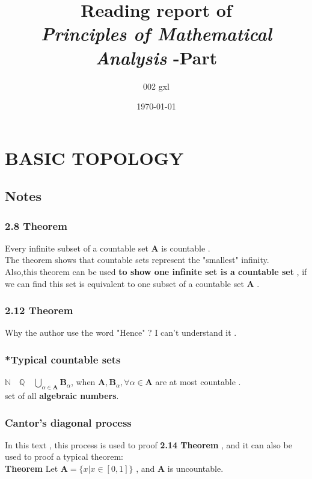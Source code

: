 \documentclass{report}
\title
{Reading report of \\
\emph{Principles of Mathematical Analysis}
-Part \uppercase\expandafter{\romannumeral2}}
\author{002 gxl}
\date{\today}
\begin{document}
    \maketitle
    \chapter*{BASIC TOPOLOGY}
        \section*{Notes}
            \subsection*{2.8 Theorem}
            Every infinite subset of a countable set $\mathbf{A}$ is countable .\\
            The theorem shows that countable sets represent the "smallest" infinity.\\
            Also,this theorem can be used \textbf{to show one infinite set is a countable set} , 
            if we can find this set is equivalent to one subset of a countable set $\mathbf{A}$ .
            
            \subsection*{2.12 Theorem}
            Why the author use the word "Hence" ? I can't understand it .\\
            
            \subsection*{*Typical countable sets}
            $\mathbb{N} \quad  \mathbb{Q} \quad 
            \bigcup_{\alpha \in \mathbf{A}} \mathbf{B}_\alpha $, when $\mathbf{A},\mathbf{B}_\alpha , \forall \alpha \in \mathbf{A}$ are at most countable .\\
            set of all \textbf{algebraic numbers}.\\
            
            \subsection*{Cantor's diagonal process}
            In this text , this process is used to proof \textbf{2.14 Theorem} , 
            and it can also be used to proof a typical theorem:\\
            \textbf{Theorem} Let $\mathbf{A}=\{x | x \in [0,1]\}$ , and $\mathbf{A}$ is uncountable.\\
            
\end{document}
